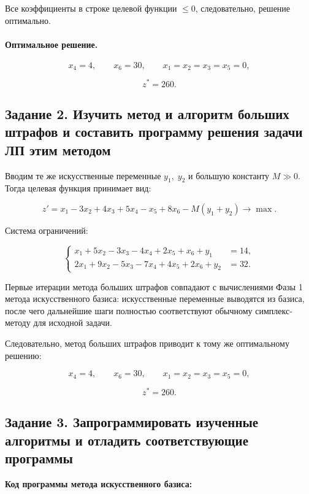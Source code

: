\documentclass[a4paper,14pt]{extarticle}
\begin{document}
Все коэффициенты в строке целевой функции \(\le 0\), следовательно, решение оптимально.

\paragraph{Оптимальное решение.}

\[
x_4=4,\qquad x_6=30,\qquad x_1=x_2=x_3=x_5=0,
\]

\[
z^*=260.
\]

\subsection*{Задание 2. Изучить метод и алгоритм больших штрафов и составить программу решения задачи ЛП этим методом}

Вводим те же искусственные переменные \(y_1,\;y_2\) и большую константу \(M\gg0\). Тогда целевая функция принимает вид:

\[
z'=x_1-3x_2+4x_3+5x_4-x_5+8x_6-M(y_1+y_2)\to \max.
\]

Система ограничений:

\[
\left\{
\begin{aligned}
x_1+5x_2-3x_3-4x_4+2x_5+x_6+y_1&=14,\\
2x_1+9x_2-5x_3-7x_4+4x_5+2x_6+y_2&=32.
\end{aligned}
\right.
\]

Первые итерации метода больших штрафов совпадают с вычислениями Фазы 1 метода искусственного базиса: искусственные переменные выводятся из базиса, после чего дальнейшие шаги полностью соответствуют обычному симплекс-методу для исходной задачи.

Следовательно, метод больших штрафов приводит к тому же оптимальному решению:

\[
x_4=4,\qquad x_6=30,\qquad x_1=x_2=x_3=x_5=0,
\]

\[
z^*=260.
\]

\subsection*{Задание 3. Запрограммировать изученные алгоритмы и отладить соответствующие программы}

\noindent\textbf{Код программы метода искусственного базиса:}
\end{document}
